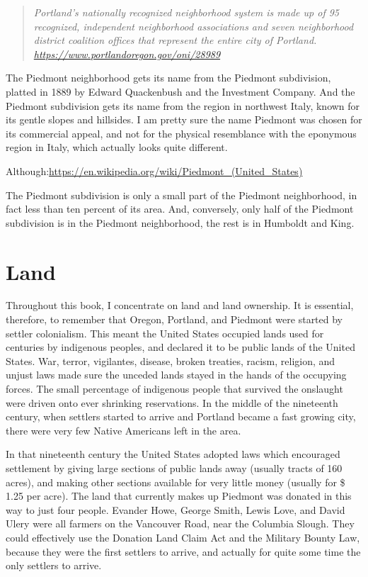 \documentclass[
  12pt,
]{book}
\begin{document}
\begin{quote}
\emph{Portland's nationally recognized neighborhood system is made up of 95 recognized,
independent neighborhood associations and seven neighborhood district coalition offices
that represent the entire city of Portland.
\url{https://www.portlandoregon.gov/oni/28989}}
\end{quote}

The Piedmont neighborhood gets its name from the Piedmont subdivision, platted in 1889 by Edward Quackenbush and the Investment Company. And the Piedmont subdivision gets its name from the region in northwest Italy, known for its gentle slopes and hillsides. I am pretty sure the name Piedmont was chosen for its commercial appeal, and not for the physical resemblance with the eponymous region in Italy, which actually looks quite different.

Although:\url{https://en.wikipedia.org/wiki/Piedmont_(United_States)}

The Piedmont subdivision is only a small part of the Piedmont neighborhood, in fact less than ten percent of its area. And, conversely, only half of the Piedmont subdivision is in the Piedmont neighborhood, the rest is in Humboldt and King.

\hypertarget{land}{%
\section{Land}\label{land}}

Throughout this book, I concentrate on land and land ownership. It is essential, therefore, to remember that Oregon, Portland, and Piedmont were started by settler colonialism. This meant the United States occupied lands used for centuries by indigenous peoples, and declared it to be public lands of the United States. War, terror, vigilantes, disease, broken treaties, racism, religion, and unjust laws made sure the unceded lands stayed in the hands of the occupying forces. The small percentage of indigenous people that survived the onslaught were driven onto ever shrinking reservations. In the middle of the nineteenth century, when settlers started to arrive and Portland became a fast growing city, there were very few Native Americans left in the area.

In that nineteenth century the United States adopted laws which encouraged settlement by giving large sections of public lands away (usually tracts of 160 acres), and making other sections available for very little money (usually for \$ 1.25 per acre). The land that currently makes up Piedmont was donated in this way to just four people. Evander Howe, George Smith, Lewis Love, and David Ulery were all farmers on the Vancouver Road, near the Columbia Slough. They could effectively use the Donation Land Claim Act and the Military Bounty Law, because they were the first settlers to arrive, and actually for quite some time the only settlers to arrive.
\end{document}
